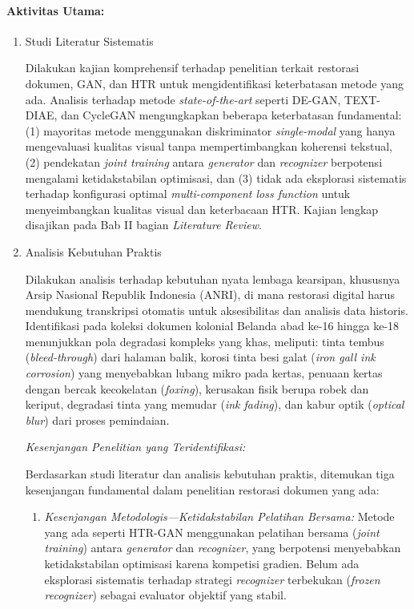 \documentclass[12pt,a4paper]{article}
\begin{document}
\paragraph{Aktivitas Utama:}

\begin{enumerate}[label=\arabic*., leftmargin=*, nosep]
\item Studi Literatur Sistematis

Dilakukan kajian komprehensif terhadap penelitian terkait restorasi dokumen, GAN, dan HTR untuk mengidentifikasi keterbatasan metode yang ada. Analisis terhadap metode \textit{state-of-the-art} seperti DE-GAN, TEXT-DIAE, dan CycleGAN mengungkapkan beberapa keterbatasan fundamental: (1) mayoritas metode menggunakan diskriminator \textit{single-modal} yang hanya mengevaluasi kualitas visual tanpa mempertimbangkan koherensi tekstual, (2) pendekatan \textit{joint training} antara \textit{generator} dan \textit{recognizer} berpotensi mengalami ketidakstabilan optimisasi, dan (3) tidak ada eksplorasi sistematis terhadap konfigurasi optimal \textit{multi-component loss function} untuk menyeimbangkan kualitas visual dan keterbacaan HTR. Kajian lengkap disajikan pada Bab II bagian \textit{Literature Review}.

\item Analisis Kebutuhan Praktis

Dilakukan analisis terhadap kebutuhan nyata lembaga kearsipan, khususnya Arsip Nasional Republik Indonesia (ANRI), di mana restorasi digital harus mendukung transkripsi otomatis untuk aksesibilitas dan analisis data historis. Identifikasi pada koleksi dokumen kolonial Belanda abad ke-16 hingga ke-18 menunjukkan pola degradasi kompleks yang khas, meliputi: tinta tembus (\textit{bleed-through}) dari halaman balik, korosi tinta besi galat (\textit{iron gall ink corrosion}) yang menyebabkan lubang mikro pada kertas, penuaan kertas dengan bercak kecokelatan (\textit{foxing}), kerusakan fisik berupa robek dan keriput, degradasi tinta yang memudar (\textit{ink fading}), dan kabur optik (\textit{optical blur}) dari proses pemindaian.

\textit{Kesenjangan Penelitian yang Teridentifikasi:}

Berdasarkan studi literatur dan analisis kebutuhan praktis, ditemukan tiga kesenjangan fundamental dalam penelitian restorasi dokumen yang ada:

\begin{enumerate}[label=(\alph*), leftmargin=*, nosep]
\item \textit{Kesenjangan Metodologis---Ketidakstabilan Pelatihan Bersama:} Metode yang ada seperti HTR-GAN menggunakan pelatihan bersama (\textit{joint training}) antara \textit{generator} dan \textit{recognizer}, yang berpotensi menyebabkan ketidakstabilan optimisasi karena kompetisi gradien. Belum ada eksplorasi sistematis terhadap strategi \textit{recognizer} terbekukan (\textit{frozen recognizer}) sebagai evaluator objektif yang stabil.


\end{enumerate}
\end{enumerate}
\end{document}
